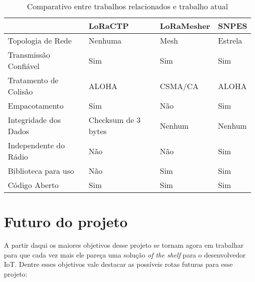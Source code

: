 \begin{table}[H]
    \begin{center}
    \caption{Comparativo entre trabalhos relacionados e trabalho atual}
    \label{table:rel-comp-atual}
    \begin{tabular}{|l|l|l|l|}
    \hline
     & LoRaCTP & LoRaMesher & SNPES \\
    \hline
    Topologia de Rede & Nenhuma & Mesh & Estrela \\
    \hline
    Transmissão Confiável & Sim & Sim & Sim \\
    \hline
    Tratamento de Colisão & ALOHA & CSMA/CA & ALOHA \\
    \hline
    Empacotamento & Sim & Não & Sim \\
    \hline
    Integridade dos Dados & Checksum de 3 bytes & Nenhum & Nenhum \\
    \hline
    Independente do Rádio & Não & Não & Sim \\
    \hline
    Biblioteca para uso & Não & Sim & Sim \\
    \hline
    Código Aberto & Sim & Sim & Sim \\
    \hline
    \end{tabular}
    \end{center}
\end{table}

\section{Futuro do projeto}

A partir daqui os maiores objetivos desse projeto se tornam agora em trabalhar
para que cada vez mais ele pareça uma solução \textit{of the shelf} para o
desenvolvedor IoT. Dentre esses objetivos vale destacar as possíveis rotas futuras
para esse projeto:

